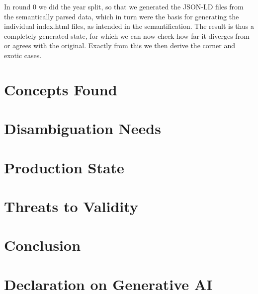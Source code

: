 \documentclass{ceurart}
\begin{document}
In round 0 we did the year split, so that we generated the JSON-LD files from
the semantically parsed data, which in turn were the basis for generating the
individual index.html files, as intended in the semantification. The result is
thus a completely generated state, for which we can now check how far it
diverges from or agrees with the original. Exactly from this we then derive
the corner and exotic cases.

\section{Concepts Found}\label{sec:concepts}

\section{Disambiguation Needs}\label{sec:disambiguation}

\section{Production State}\label{sec:production}

\section{Threats to Validity}\label{sec:threats}

\section{Conclusion}\label{sec:conclusion}

\section*{Declaration on Generative AI}

\nocite{ceurws2024genaipolicy,ceurws2024genaitaxonomy}

\end{document}
